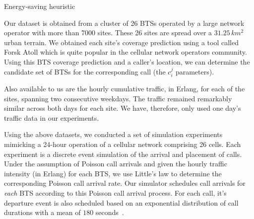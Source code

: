 \IncMargin{1em}
\LinesNumbered
\begin{algorithm}
\caption{Energy-saving heuristic}
\label{algo:heur1}
\end{algorithm}
\DecMargin{1em}

Our dataset is obtained from a cluster of 26 BTSs operated by a large network operator with more than 7000 sites. These 26 sites are spread over a $31.25$\,$km^2$ urban terrain. We obtained each site's coverage prediction using a tool called Forsk Atoll which is quite popular in the cellular network operators community. Using this BTS coverage prediction and a caller's location, we can determine the candidate set of BTSs for the corresponding call (the $c_i^j$ parameters). 

Also available to us are the hourly cumulative traffic, in Erlang, for each of the sites, spanning two consecutive weekdays. The traffic remained remarkably similar across both days for each site. We have, therefore, only used one day's traffic data in our experiments.

Using the above datasets, we conducted a set of simulation experiments mimicking a 24-hour operation of a cellular network comprising 26 cells.
Each experiment is a discrete event simulation of the arrival and placement of calls.
Under the assumption of Poisson call arrivals and given the hourly traffic intensity (in Erlang) for each BTS, we use Little's law to determine the corresponding Poisson call arrival rate.
Our simulator schedules call arrivals for \emph{each} BTS according to this Poisson call arrival process.
For each call, it's departure event is also scheduled based on an exponential distribution of call durations with a mean of $180$ seconds~\cite{Gerla:1995:MMM:276418.276421}.

